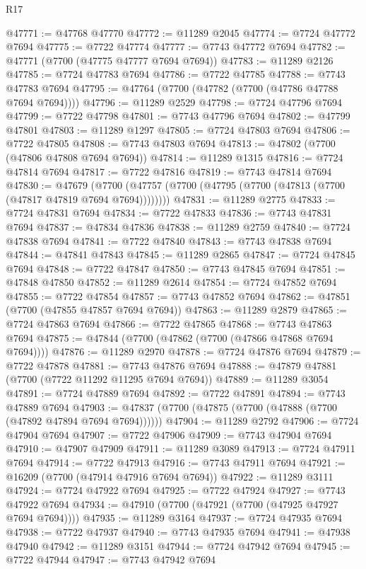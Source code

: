 \begin{lexlean}{R17}
\begin{coremodule}
@47771 := @47768 @47770
@47772 := @11289 @2045
@47774 := @7724 @47772 @7694
@47775 := @7722 @47774
@47777 := @7743 @47772 @7694
@47782 := @47771 (@7700 (@47775 @47777 @7694 @7694))
@47783 := @11289 @2126
@47785 := @7724 @47783 @7694
@47786 := @7722 @47785
@47788 := @7743 @47783 @7694
@47795 := @47764 (@7700 (@47782 (@7700 (@47786 @47788 @7694 @7694))))
@47796 := @11289 @2529
@47798 := @7724 @47796 @7694
@47799 := @7722 @47798
@47801 := @7743 @47796 @7694
@47802 := @47799 @47801
@47803 := @11289 @1297
@47805 := @7724 @47803 @7694
@47806 := @7722 @47805
@47808 := @7743 @47803 @7694
@47813 := @47802 (@7700 (@47806 @47808 @7694 @7694))
@47814 := @11289 @1315
@47816 := @7724 @47814 @7694
@47817 := @7722 @47816
@47819 := @7743 @47814 @7694
@47830 := @47679
    (@7700 (@47757 (@7700 (@47795 (@7700 (@47813 (@7700 (@47817 @47819 @7694 @7694))))))))
@47831 := @11289 @2775
@47833 := @7724 @47831 @7694
@47834 := @7722 @47833
@47836 := @7743 @47831 @7694
@47837 := @47834 @47836
@47838 := @11289 @2759
@47840 := @7724 @47838 @7694
@47841 := @7722 @47840
@47843 := @7743 @47838 @7694
@47844 := @47841 @47843
@47845 := @11289 @2865
@47847 := @7724 @47845 @7694
@47848 := @7722 @47847
@47850 := @7743 @47845 @7694
@47851 := @47848 @47850
@47852 := @11289 @2614
@47854 := @7724 @47852 @7694
@47855 := @7722 @47854
@47857 := @7743 @47852 @7694
@47862 := @47851 (@7700 (@47855 @47857 @7694 @7694))
@47863 := @11289 @2879
@47865 := @7724 @47863 @7694
@47866 := @7722 @47865
@47868 := @7743 @47863 @7694
@47875 := @47844 (@7700 (@47862 (@7700 (@47866 @47868 @7694 @7694))))
@47876 := @11289 @2970
@47878 := @7724 @47876 @7694
@47879 := @7722 @47878
@47881 := @7743 @47876 @7694
@47888 := @47879 @47881 (@7700 (@7722 @11292 @11295 @7694 @7694))
@47889 := @11289 @3054
@47891 := @7724 @47889 @7694
@47892 := @7722 @47891
@47894 := @7743 @47889 @7694
@47903 := @47837 (@7700 (@47875 (@7700 (@47888 (@7700 (@47892 @47894 @7694 @7694))))))
@47904 := @11289 @2792
@47906 := @7724 @47904 @7694
@47907 := @7722 @47906
@47909 := @7743 @47904 @7694
@47910 := @47907 @47909
@47911 := @11289 @3089
@47913 := @7724 @47911 @7694
@47914 := @7722 @47913
@47916 := @7743 @47911 @7694
@47921 := @16209 (@7700 (@47914 @47916 @7694 @7694))
@47922 := @11289 @3111
@47924 := @7724 @47922 @7694
@47925 := @7722 @47924
@47927 := @7743 @47922 @7694
@47934 := @47910 (@7700 (@47921 (@7700 (@47925 @47927 @7694 @7694))))
@47935 := @11289 @3164
@47937 := @7724 @47935 @7694
@47938 := @7722 @47937
@47940 := @7743 @47935 @7694
@47941 := @47938 @47940
@47942 := @11289 @3151
@47944 := @7724 @47942 @7694
@47945 := @7722 @47944
@47947 := @7743 @47942 @7694

\end{coremodule}
\end{lexlean}
